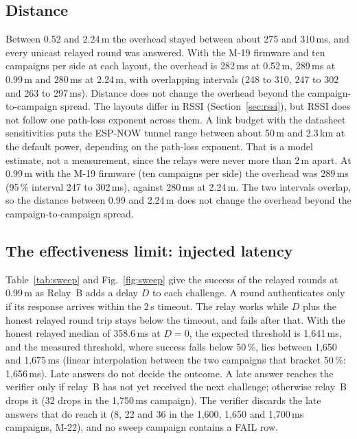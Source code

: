 \documentclass{ieeeaccess}
\begin{document}
\subsection{Distance}

Between 0.52 and 2.24\,m the overhead stayed between about 275 and 310\,ms, and every unicast relayed round was answered. With the M-19 firmware and ten campaigns per side at each layout, the overhead is 282\,ms at 0.52\,m, 289\,ms at 0.99\,m and 280\,ms at 2.24\,m, with overlapping intervals (248 to 310, 247 to 302 and 263 to 297\,ms). Distance does not change the overhead beyond the campaign-to-campaign spread. The layouts differ in RSSI (Section~\ref{sec:rssi}), but RSSI does not follow one path-loss exponent across them. A link budget with the datasheet sensitivities puts the ESP-NOW tunnel range between about 50\,m and 2.3\,km at the default power, depending on the path-loss exponent. That is a model estimate, not a measurement, since the relays were never more than 2\,m apart. At 0.99\,m with the M-19 firmware (ten campaigns per side) the overhead was 289\,ms (95\,\% interval 247 to 302\,ms), against 280\,ms at 2.24\,m. The two intervals overlap, so the distance between 0.99 and 2.24\,m does not change the overhead beyond the campaign-to-campaign spread.

\subsection{The effectiveness limit: injected latency}
\label{sec:sweep}

Table~\ref{tab:sweep} and Fig.~\ref{fig:sweep} give the success of the relayed rounds at 0.99\,m as Relay~B adds a delay $D$ to each challenge. A round authenticates only if its response arrives within the 2\,s timeout. The relay works while $D$ plus the honest relayed round trip stays below the timeout, and fails after that. With the honest relayed median of 358.6\,ms at $D=0$, the expected threshold is 1,641\,ms, and the measured threshold, where success falls below 50\,\%, lies between 1,650 and 1,675\,ms (linear interpolation between the two campaigns that bracket 50\,\%: 1,656\,ms). Late answers do not decide the outcome. A late answer reaches the verifier only if relay~B has not yet received the next challenge; otherwise relay~B drops it (32 drops in the 1,750\,ms campaign). The verifier discards the late answers that do reach it (8, 22 and 36 in the 1,600, 1,650 and 1,700\,ms campaigns, M-22), and no sweep campaign contains a FAIL row.
\end{document}
